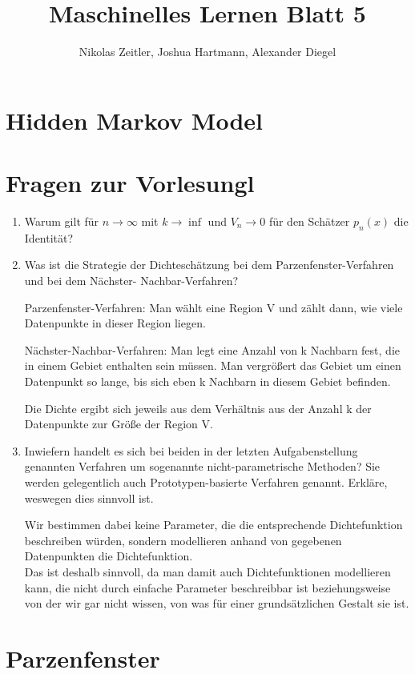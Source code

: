 \documentclass[a4paper]{scrartcl}
\author{Nikolas Zeitler, Joshua Hartmann, Alexander Diegel}
\title{Maschinelles Lernen Blatt 5}
\begin{document}
\maketitle
\section{Hidden Markov Model}
\section{Fragen zur Vorlesungl}
\begin{enumerate}
	\item Warum gilt für $n\rightarrow\infty$ mit $k\rightarrow\inf$ und $V_n \rightarrow 0$ für den Schätzer $p_n(x)$ die Identität?
	
	
	\item Was ist die Strategie der Dichteschätzung bei dem Parzenfenster-Verfahren und bei dem Nächster-
	Nachbar-Verfahren?
	
	Parzenfenster-Verfahren: Man wählt eine Region V und zählt dann, wie viele Datenpunkte in dieser Region liegen.
	
	Nächster-Nachbar-Verfahren: Man legt eine Anzahl von k Nachbarn fest, die in einem Gebiet enthalten sein müssen. Man vergrößert das Gebiet um einen Datenpunkt so lange, bis sich eben k Nachbarn in diesem Gebiet befinden.
	
	Die Dichte ergibt sich jeweils aus dem Verhältnis aus der Anzahl k der Datenpunkte zur Größe der Region V.
	
	\item Inwiefern handelt es sich bei beiden in der letzten Aufgabenstellung genannten Verfahren um
	sogenannte nicht-parametrische Methoden? Sie werden gelegentlich auch Prototypen-basierte
	Verfahren genannt. Erkläre, weswegen dies sinnvoll ist.
	
	Wir bestimmen dabei keine Parameter, die die entsprechende Dichtefunktion beschreiben würden, sondern modellieren anhand von gegebenen Datenpunkten die Dichtefunktion.\\
	Das ist deshalb sinnvoll, da man damit auch Dichtefunktionen modellieren kann, die nicht durch einfache Parameter beschreibbar ist beziehungsweise von der wir gar nicht wissen, von was für einer grundsätzlichen Gestalt sie ist.
\end{enumerate}

\section{Parzenfenster}
\end{document}
